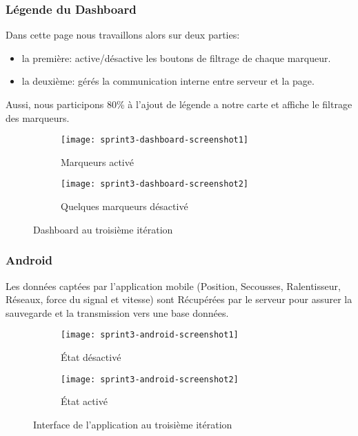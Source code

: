 \subsubsection{Légende du Dashboard}

Dans cette page nous travaillons alors sur deux parties:

\begin{itemize}
    \item la première: active/désactive les boutons de filtrage de chaque
        marqueur.
    \item la deuxième: gérés la communication interne entre serveur et la page.
\end{itemize}

Aussi, nous participons 80\% à l'ajout de légende a notre carte et affiche le
filtrage des marqueurs.

\begin{figure}[H]
\centering
    \begin{subfigure}{.8\textwidth}
    \centering
  \centering
  \texttt{[image: sprint3-dashboard-screenshot1]}
  \caption{Marqueurs activé}
\label{fig:sprint3-dashboard-screenshot1}
\end{subfigure}
\begin{subfigure}{.8\textwidth}
    \centering
  \centering
  \texttt{[image: sprint3-dashboard-screenshot2]}
  \caption{Quelques marqueurs désactivé}
\label{sprint3-dashboard-screenshot2}
\end{subfigure}
\caption{Dashboard  au troisième itération}
\end{figure}

\subsubsection{Android}

Les données captées par l'application mobile (Position, Secousses,
Ralentisseur, Réseaux, force du signal et vitesse) sont Récupérées par le
serveur pour assurer la sauvegarde et la transmission vers une base données.

\begin{figure}[H]
\centering
    \begin{subfigure}{.4\textwidth}
    \centering
  \centering
  \texttt{[image: sprint3-android-screenshot1]}
  \caption{État désactivé}
\label{fig:sprint3-android-screenshot1}
\end{subfigure}
\begin{subfigure}{.4\textwidth}
    \centering
  \centering
  \texttt{[image: sprint3-android-screenshot2]}
  \caption{État activé}
\label{fig:sprint3-android-screenshot2}
\end{subfigure}
\caption{Interface de l'application au troisième itération}
\end{figure}

